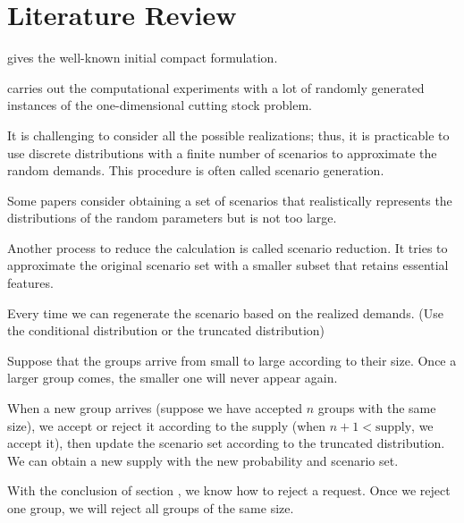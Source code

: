 \section{Literature Review}

\cite{gilmore1961linear} gives the well-known initial compact formulation.

\cite{scheithauer1995modified} carries out the computational experiments with a lot of randomly generated instances of the one-dimensional cutting stock problem. 


%
% 

It is challenging to consider all the possible realizations; thus, it is practicable to use discrete distributions with a finite number of scenarios to approximate the random demands. This procedure is often called scenario generation.

Some papers consider obtaining a set of scenarios that realistically represents the distributions of the random parameters but is not too large. \cite{feng2013scenario} \cite{casey2005scenario}
\cite{henrion2018problem}

Another process to reduce the calculation is called scenario reduction. It tries to approximate the original scenario set with a smaller subset that retains essential features.



Every time we can regenerate the scenario based on the realized demands. (Use the conditional distribution or the truncated distribution)


Suppose that the groups arrive from small to large according to their size. Once a larger group comes, the smaller one will never appear again.

When a new group arrives (suppose we have accepted $n$ groups with the same size), we accept or reject it according to the supply (when $n+1 < \text{supply}$, we accept it), then update the scenario set according to the truncated distribution. We can obtain a new supply with the new probability and scenario set.

With the conclusion of section , we know how to reject a request. Once we reject one group, we will reject all groups of the same size. 


\newpage
